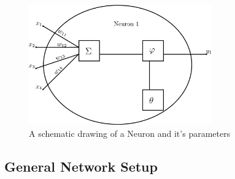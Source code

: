 \begin{figure}[h!]
\label{fig:neuron}
\caption{A schematic drawing of a Neuron and it's parameters}
\centering
\includegraphics[width=0.7\textwidth]{images/neuron.png}
\end{figure}

\subsection{General Network Setup}
\label{sec:fund:netSetup}

